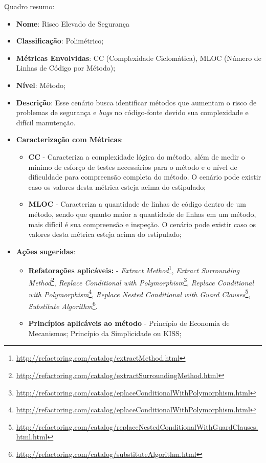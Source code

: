 %

Quadro resumo:

\begin{itemize}
\item \textbf{Nome}: Risco Elevado de Segurança
\item \textbf{Classificação}: Polimétrico;
\item \textbf{Métricas Envolvidas}: CC (Complexidade Ciclomática), MLOC (Número de Linhas de Código por Método);
\item \textbf{Nível}: Método;
\item \textbf{Descrição}: Esse cenário busca identificar métodos que aumentam o risco de problemas de segurança e \emph{bugs} no código-fonte devido sua complexidade e difícil manutenção.
\item \textbf{Caracterização com Métricas}: 
	\begin{itemize}
	\item \textbf{CC} - Caracteriza a complexidade lógica do método, além de medir o mínimo de esforço de testes necessários para o método e o nível de dificuldade para compreensão completa do método. O cenário pode existir caso os valores desta métrica esteja acima do estipulado;
	\item \textbf{MLOC} - Caracteriza a quantidade de linhas de código dentro de um método, sendo que quanto maior a quantidade de linhas em um método, mais difícil é sua compreensão e inspeção. O cenário pode existir caso os valores desta métrica esteja acima do estipulado; 
	\end{itemize}
\item \textbf{Ações sugeridas}:
	\begin{itemize}
	\item \textbf{Refatorações aplicáveis:} - \emph{Extract Method}\footnote{\url{http://refactoring.com/catalog/extractMethod.html}},  \emph{Extract Surrounding Method}\footnote{\url{http://refactoring.com/catalog/extractSurroundingMethod.html}}, \emph{Replace Conditional with Polymorphism}\footnote{\url{http://refactoring.com/catalog/eplaceConditionalWithPolymorphism.html}}, \emph{Replace Conditional with Polymorphism}\footnote{\url{http://refactoring.com/catalog/eplaceConditionalWithPolymorphism.html}}, \emph{Replace Nested Conditional with Guard Clauses}\footnote{\url{http://refactoring.com/catalog/replaceNestedConditionalWithGuardClauses.html.html}}, \emph{Substitute Algorithm}\footnote{\url{http://refactoring.com/catalog/substituteAlgorithm.html}}.
	\item \textbf{Princípios aplicáveis ao método} - Princípio de Economia de Mecanismos; Princípio da Simplicidade ou KISS;
	\end{itemize}
\end{itemize}


